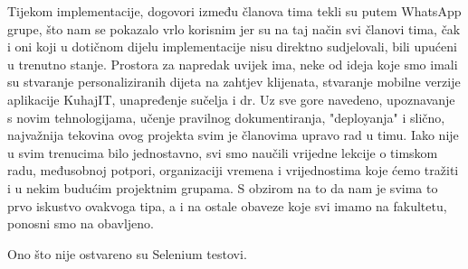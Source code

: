 		Tijekom implementacije, dogovori između članova tima tekli su putem WhatsApp grupe, što nam se pokazalo vrlo korisnim jer su na taj način svi članovi tima, čak i oni koji u dotičnom dijelu implementacije nisu direktno sudjelovali, bili upućeni u trenutno stanje.
		Prostora za napredak uvijek ima, neke od ideja koje smo imali su stvaranje personaliziranih dijeta na zahtjev klijenata, stvaranje mobilne verzije aplikacije KuhajIT, unapređenje sučelja i dr.
		Uz sve gore navedeno, upoznavanje s novim tehnologijama, učenje pravilnog dokumentiranja, "deployanja" i slično, najvažnija tekovina ovog projekta svim je članovima upravo rad u timu. Iako nije u svim trenucima bilo jednostavno, svi smo naučili vrijedne lekcije o timskom radu, međusobnoj potpori, organizaciji vremena i vrijednostima koje ćemo tražiti i u nekim budućim projektnim grupama.
		S obzirom na to da nam je svima to prvo iskustvo ovakvoga tipa, a i na ostale obaveze koje svi imamo na fakultetu, ponosni smo na obavljeno.
		
		Ono što nije ostvareno su Selenium testovi.
				\eject 